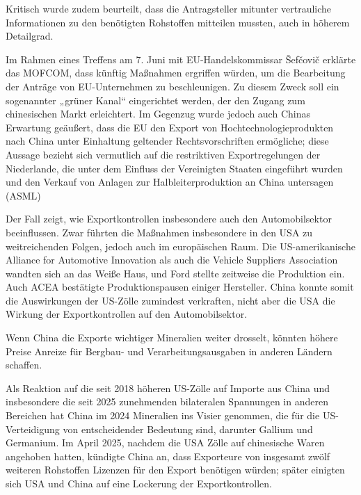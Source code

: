 \documentclass[12pt,a4paper,oneside]{book} %
\begin{document}
Kritisch wurde zudem beurteilt, dass die Antragsteller mitunter vertrauliche Informationen zu den benötigten Rohstoffen mitteilen mussten, auch in höherem Detailgrad.

Im Rahmen eines Treffens am 7. Juni mit EU-Handelskommissar Šefčovič erklärte das MOFCOM, dass künftig Maßnahmen ergriffen würden, um die Bearbeitung der Anträge von EU-Unternehmen zu beschleunigen. Zu diesem Zweck soll ein sogenannter „grüner Kanal“ eingerichtet werden, der den Zugang zum chinesischen Markt erleichtert. Im Gegenzug wurde jedoch auch Chinas Erwartung geäußert, dass die EU den Export von Hochtechnologieprodukten nach China unter Einhaltung geltender Rechtsvorschriften ermögliche; diese Aussage bezieht sich vermutlich auf die restriktiven Exportregelungen der Niederlande, die unter dem Einfluss der Vereinigten Staaten eingeführt wurden und den Verkauf von Anlagen zur Halbleiterproduktion an China untersagen (ASML)



Der Fall zeigt, wie Exportkontrollen insbesondere auch den Automobilsektor beeinflussen. Zwar führten die  Maßnahmen insbesondere in den USA zu weitreichenden Folgen, jedoch auch im europäischen Raum. Die US-amerikanische Alliance for Automotive Innovation als auch die Vehicle Suppliers Association wandten sich an das Weiße Haus, und Ford stellte zeitweise die Produktion ein. Auch ACEA bestätigte Produktionspausen einiger Hersteller. China konnte somit die Auswirkungen der US-Zölle zumindest verkraften, nicht aber die USA die Wirkung der Exportkontrollen auf den Automobilsektor.



Wenn China die Exporte wichtiger Mineralien weiter drosselt, könnten höhere Preise Anreize für Bergbau- und Verarbeitungsausgaben in anderen Ländern schaffen.

Als Reaktion auf die seit 2018 höheren US-Zölle auf Importe aus China und insbesondere die seit 2025 zunehmenden bilateralen Spannungen in anderen Bereichen hat China im 2024 Mineralien ins Visier genommen, die für die US-Verteidigung von entscheidender Bedeutung sind, darunter Gallium und Germanium. Im April 2025, nachdem die USA Zölle auf chinesische Waren angehoben hatten, kündigte China an, dass Exporteure von insgesamt zwölf weiteren Rohstoffen Lizenzen für den Export benötigen würden; später einigten sich USA und China auf eine Lockerung der Exportkontrollen.
\end{document}
